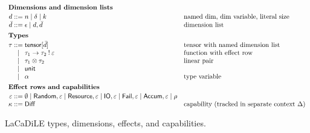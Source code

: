 
\providecommand{\tensor}[1]{\mathsf{tensor}[#1]}
\providecommand{\letin}[2]{\mathsf{let}\,#1\,\mathsf{in}\,#2}
\providecommand{\letpair}[4]{\mathsf{let}\,(#1, #2) = #3\,\mathsf{in}\,#4}
\providecommand{\handlewith}[3]{\mathsf{handle}[#1]\,#2\,\mathsf{with}\,#3}
\providecommand{\performop}[1]{\mathsf{perform}\,#1}

\begin{figure}[t]
\small
\[
\begin{array}{r@{\;}c@{\;}l@{\quad}l}
\multicolumn{4}{l}{\textbf{Dimensions and dimension lists}} \\[2pt]
d & ::= & n \mid \delta \mid k & \text{named dim, dim variable, literal size} \\
\bar{d} & ::= & \epsilon \mid d, \bar{d} & \text{dimension list} \\[4pt]
\multicolumn{4}{l}{\textbf{Types}} \\[2pt]
\tau & ::= & \tensor{\bar{d}} & \text{tensor with named dimension list} \\
     & \mid & \tau_1 \to \tau_2 \mathbin{!} \varepsilon & \text{function with effect row} \\
     & \mid & \tau_1 \otimes \tau_2 & \text{linear pair} \\
     & \mid & \mathsf{unit} & \\
     & \mid & \alpha & \text{type variable} \\[4pt]
\multicolumn{4}{l}{\textbf{Effect rows and capabilities}} \\[2pt]
\varepsilon & ::= & \emptyset \mid \mathsf{Random}, \varepsilon \mid \mathsf{Resource}, \varepsilon \mid \mathsf{IO}, \varepsilon \mid \mathsf{Fail}, \varepsilon \mid \mathsf{Accum}, \varepsilon \mid \rho \\
\kappa & ::= & \mathsf{Diff} & \text{capability (tracked in separate context $\Delta$)} \\
\end{array}
\]
\caption{LaCaDiLE types, dimensions, effects, and capabilities.}
\label{fig:syntax-types}
\end{figure}


